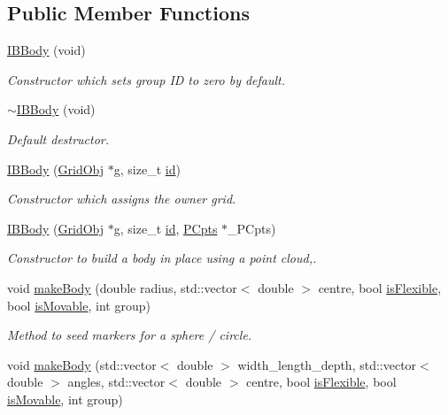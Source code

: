 \subsection*{Public Member Functions}
\begin{DoxyCompactItemize}
\item 
\hyperlink{class_i_b_body_a5fbec47db22b9d525724f232d1d81037}{I\+B\+Body} (void)
\begin{DoxyCompactList}\small\item\em Constructor which sets group ID to zero by default. \end{DoxyCompactList}\item 
\hyperlink{class_i_b_body_afe26e702d31e91f562aecd04a5f5c7f0}{$\sim$\+I\+B\+Body} (void)
\begin{DoxyCompactList}\small\item\em Default destructor. \end{DoxyCompactList}\item 
\hyperlink{class_i_b_body_a737e9f9ecfff9a1ea0741b03a43c3478}{I\+B\+Body} (\hyperlink{class_grid_obj}{Grid\+Obj} $\ast$g, size\+\_\+t \hyperlink{class_body_a9d5166d7419f303190b6c6543e67e815}{id})
\begin{DoxyCompactList}\small\item\em Constructor which assigns the owner grid. \end{DoxyCompactList}\item 
\hyperlink{class_i_b_body_a8c95ff82ebef5f8e86519f656576cbce}{I\+B\+Body} (\hyperlink{class_grid_obj}{Grid\+Obj} $\ast$g, size\+\_\+t \hyperlink{class_body_a9d5166d7419f303190b6c6543e67e815}{id}, \hyperlink{class_p_cpts}{P\+Cpts} $\ast$\+\_\+\+P\+Cpts)
\begin{DoxyCompactList}\small\item\em Constructor to build a body in place using a point cloud,. \end{DoxyCompactList}\item 
void \hyperlink{class_i_b_body_a3915b9b08d1264c4f261e8b8585e5ffe}{make\+Body} (double radius, std\+::vector$<$ double $>$ centre, bool \hyperlink{class_i_b_body_a58de7cc12e734b646904e81a56b18b4e}{is\+Flexible}, bool \hyperlink{class_i_b_body_a9f0773d31ac48e0f5b3174e6040732f9}{is\+Movable}, int group)
\begin{DoxyCompactList}\small\item\em Method to seed markers for a sphere / circle. \end{DoxyCompactList}\item 
void \hyperlink{class_i_b_body_a5339567c62f8cb4ae6db99c551bb6b9f}{make\+Body} (std\+::vector$<$ double $>$ width\+\_\+length\+\_\+depth, std\+::vector$<$ double $>$ angles, std\+::vector$<$ double $>$ centre, bool \hyperlink{class_i_b_body_a58de7cc12e734b646904e81a56b18b4e}{is\+Flexible}, bool \hyperlink{class_i_b_body_a9f0773d31ac48e0f5b3174e6040732f9}{is\+Movable}, int group)

\end{DoxyCompactItemize}

